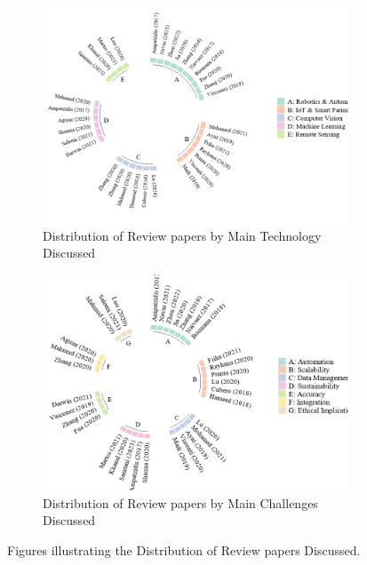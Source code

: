 \documentclass[a4paper,fleqn]{cas-dc}
\begin{document}
\begin{figure}[h]
    \centering
    \begin{subfigure}[t]{0.45\textwidth}
        \centering
        \includegraphics[width=\textwidth]{fig_review_tech.png}
        \caption{Distribution of Review papers by Main Technology Discussed }
        \label{fig:tech1}
    \end{subfigure}
    \hspace{0.05\textwidth}
    \begin{subfigure}[t]{0.4\textwidth}
        \centering
        \includegraphics[width=\textwidth]{fig_review_challenge.png}
        \caption{Distribution of Review papers by Main Challenges Discussed}
        \label{fig:challenge1}
    \end{subfigure}
    
    \caption{Figures illustrating the Distribution of Review papers Discussed.}
    \label{fig:combined_review_figures}
\end{figure}
\end{document}
